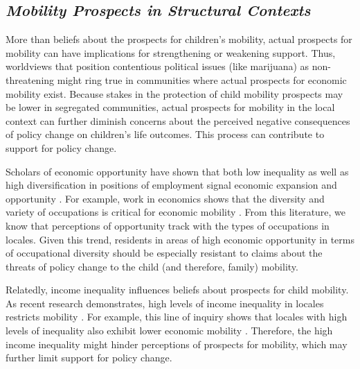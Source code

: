 \subsection{\it{Mobility Prospects in Structural Contexts}}

More than beliefs about the prospects for children's mobility, actual prospects for mobility can have implications for strengthening or weakening support. Thus, worldviews that position contentious political issues (like marijuana) as non-threatening might ring true in communities where actual prospects for economic mobility exist. Because stakes in the protection of child mobility prospects may be lower in segregated communities, actual prospects for mobility in the local context can further diminish concerns about the perceived negative consequences of policy change on children's life outcomes. This process can contribute to support for policy change. 


Scholars of economic opportunity have shown that both low inequality as well as high diversification in positions of employment signal economic expansion and opportunity \citep{blau_and_duncan_1967,moore_1966}. For example, work in economics shows that the diversity and variety of occupations is critical for economic mobility \citep{kline_and_moretti_2014,chetty_et_al_2014,kain_1968}. From this literature, we know that perceptions of opportunity track with the types of occupations in locales. Given this trend, residents in areas of high economic opportunity in terms of occupational diversity should be especially resistant to claims about the threats of policy change to the child (and therefore, family) mobility. 

Relatedly, income inequality influences beliefs about prospects for child mobility. As recent research demonstrates, high levels of income inequality in locales restricts mobility \citep{corak_2013,mulligan_1997}. For example, this line of inquiry shows that locales with high levels of inequality also exhibit lower economic mobility \citep{corak_2013}. Therefore, the high income inequality might hinder perceptions of prospects for mobility, which may further limit support for policy change. 



